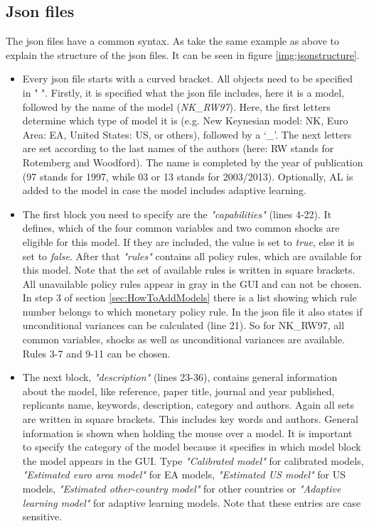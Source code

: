 \subsection*{Json files}
The json files have a common syntax. As take the same example as above to explain the structure of the json files. It can be seen in figure \ref{img:jsonstructure}.

\begin{itemize}
	\item Every json file starts with a curved bracket. All objects need to be specified in " ". Firstly, it is specified what the json file includes, here it is a model, followed by the name of the model (\textit{NK\_RW97}). Here, the first letters determine which type of model it is (e.g. New Keynesian model: NK, Euro Area: EA, United States: US, or others), followed by a `\textit{\_}'. The next letters are set according to the last names of the authors (here: RW stands for Rotemberg and Woodford). The name is completed by the year of publication (97 stands for 1997, while 03 or 13 stands for 2003/2013). Optionally, AL is added to the model in case the model includes adaptive learning. 
	\item The first block you need to specify are the \textit{"capabilities"} (lines 4-22). It defines, which of the four common variables and two common shocks are eligible for this model. If they are included, the value is set to \textit{true}, else it is set to \textit{false}. After that \textit{"rules"} contains all policy rules, which are available for this model. Note that the set of available rules is written in square brackets. All unavailable policy rules appear in gray in the GUI and can not be chosen. In step 3 of section \ref{sec:HowToAddModels} there is a list showing which rule number belongs to which monetary policy rule. In the json file it also states if unconditional variances can be calculated (line 21). So for NK\_RW97, all common variables, shocks as well as unconditional variances are available. Rules 3-7 and 9-11 can be chosen. 
	\item The next block, \textit{"description"} (lines 23-36), contains general information about the model, like reference, paper title, journal and year published, replicants name, keywords, description, category and authors. Again all sets are written in square brackets. This includes key words and authors. General information is shown when holding the mouse over a model. It is important to specify the category of the model because it specifies in which model block the model appears in the GUI. Type \textit{"Calibrated model"} for calibrated models, \textit{"Estimated euro area model"} for EA models, \textit{"Estimated US model"} for US models, \textit{"Estimated other-country model"} for other countries or \textit{"Adaptive learning model"} for adaptive learning models. Note that these entries are case sensitive.

\end{itemize}
